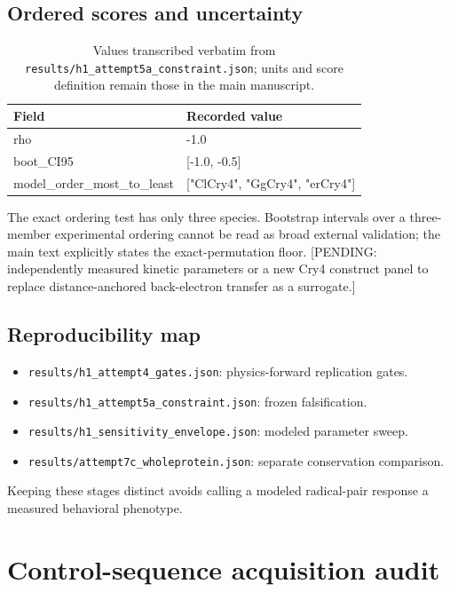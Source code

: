 \subsection{Ordered scores and uncertainty}\begin{table}[!htbp]\centering\small\caption{Values transcribed verbatim from \texttt{results/h1\_attempt5a\_constraint.json}; units and score definition remain those in the main manuscript.}\begin{tabular}{lp{8cm}}\hline Field & Recorded value \\\hline
rho & -1.0 \\
boot\_CI95 & [-1.0, -0.5] \\
model\_order\_most\_to\_least & ["ClCry4", "GgCry4", "erCry4"] \\
\hline\end{tabular}\end{table}
The exact ordering test has only three species. Bootstrap intervals over a three-member experimental ordering cannot be read as broad external validation; the main text explicitly states the exact-permutation floor. [PENDING: independently measured kinetic parameters or a new Cry4 construct panel to replace distance-anchored back-electron transfer as a surrogate.]
\subsection{Reproducibility map}
\begin{itemize}\item \texttt{results/h1\_attempt4\_gates.json}: physics-forward replication gates.\item \texttt{results/h1\_attempt5a\_constraint.json}: frozen falsification.\item \texttt{results/h1\_sensitivity\_envelope.json}: modeled parameter sweep.\item \texttt{results/attempt7c\_wholeprotein.json}: separate conservation comparison.\end{itemize} Keeping these stages distinct avoids calling a modeled radical-pair response a measured behavioral phenotype.

\section{Control-sequence acquisition audit}
